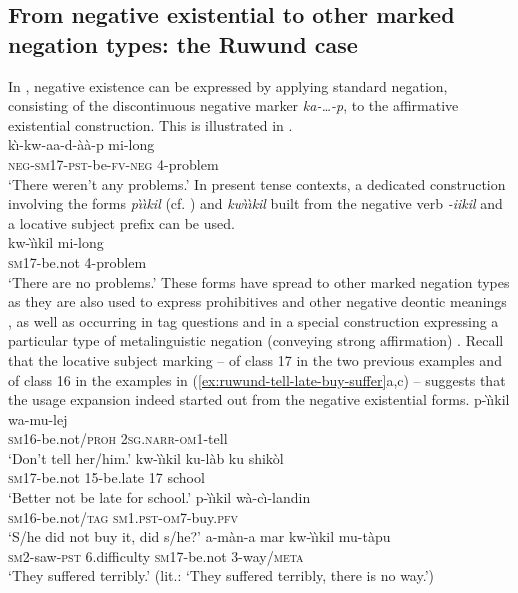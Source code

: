 \documentclass[output=paper]{langscibook}
\begin{document}
\subsection{From negative existential to other marked negation types: the
Ruwund case}\label{sec:1:6.2}
%
In , negative existence can be expressed by applying standard
negation, consisting of the discontinuous negative marker
\textit{ka-\ldots{}-p}, to the affirmative existential construction. This
is illustrated in .
%
\ea\label{ex:ruwund-problem-pst} \\ \gll k{\`\i}-kw-aa-d-{\`a}{\`a}-p mi-long\\
\textsc{neg-sm17-pst}-be-\textsc{fv-neg} 4-problem\\ \glt 	`There weren’t
any problems.' \z
%
In present tense contexts, a dedicated construction involving the forms
\textit{p{\`\i}{\`\i}kil} (cf. ) and
\textit{kw{\`\i}{\`\i}kil} built from the negative verb \textit{-iikil} and
a locative subject prefix can be used.
%
\ea\label{ex:ruwund-problem-prs} \\ \gll kw-{\`\i}{\`\i}kil mi-long\\
\textsc{sm}17-be.not  4-problem\\ \glt 	`There are no problems.' \z
%
These forms have spread to other marked negation types as they are also
used to express prohibitives  and other negative
deontic meanings , as well as occurring in tag
questions  and in a special construction expressing a
particular type of metalinguistic negation (conveying strong affirmation)
. Recall that the locative subject marking -- of
class 17 in the two previous examples and of class 16 in the examples in
(\ref{ex:ruwund-tell-late-buy-suffer}a,c) 
-- suggests that the usage expansion indeed started out from the negative
existential forms.
%
\ea\label{ex:ruwund-tell-late-buy-suffer} 
%
\ea\label{ex:ruwund-tell} \gll p-{\`\i}{\`\i}kil wa-mu-lej\\
\textsc{sm}16-be.not/\textsc{proh} 2\textsc{sg.narr}-\textsc{om}1-tell\\
\glt 	`Don’t tell her/him.'
%
\ex\label{ex:ruwund-late} \gll kw-{\`\i}{\`\i}kil ku-l{\`a}b ku
shik{\`o}l\\ \textsc{sm}17-be.not 15-be.late 17 school\\ \glt 	`Better not
be late for school.'
%
\ex\label{ex:ruwund-buy} \gll p-{\`\i}{\`\i}kil w{\`a}-c{\`\i}-landin\\
\textsc{sm}16-be.not/\textsc{tag} \textsc{sm1.pst-om}7-buy.\textsc{pfv}\\
\glt 	`S/he did not buy it, did s/he?'
%
\ex\label{ex:ruwund-suffer} \gll a-m{\`a}n-a mar kw-{\`\i}{\`\i}kil
mu-t{\`a}pu\\ \textsc{sm}2-saw-\textsc{pst} 6.difficulty
\textsc{sm}17-be.not 3-way/\textsc{meta}\\ \glt 	`They suffered
terribly.' (lit.: `They suffered terribly, there is no way.') \z\z
%
\end{document}
